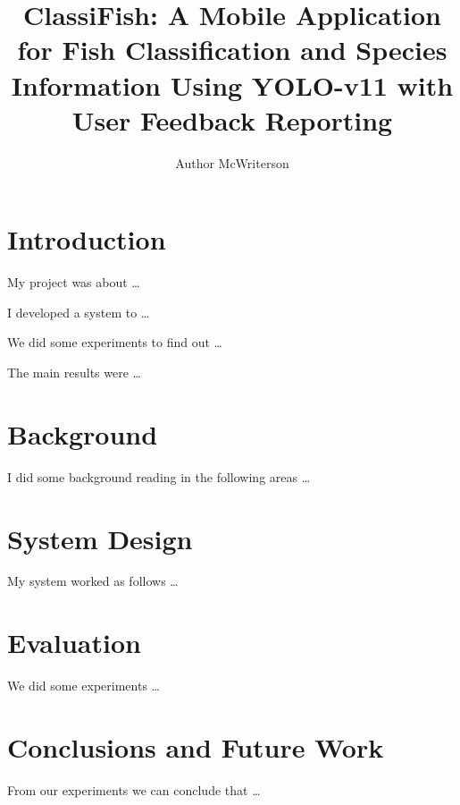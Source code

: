 \documentclass[a4paper, 11pt]{article}
\title{ClassiFish: A Mobile Application for Fish Classification and Species Information Using YOLO-v11 with User Feedback Reporting}
\author{Author McWriterson}
\begin{document}
\maketitle

\newpage

\tableofcontents

\newpage

\section{Introduction}

My project was about \ldots

I developed a system to \ldots

We did some experiments to find out \ldots

The main results were \ldots

\pagebreak

\section{Background}

I did some background reading in the following areas \ldots

\pagebreak

\section{System Design}

My system worked as follows \ldots

\pagebreak

\section{Evaluation}

We did some experiments \ldots

\pagebreak

\section{Conclusions and Future Work}

From our experiments we can conclude that \ldots


\end{document}
